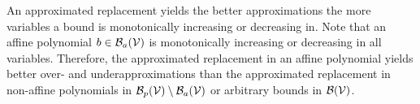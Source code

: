 An approximated replacement yields the better approximations the more variables a bound is monotonically increasing or decreasing in.
Note that an affine polynomial $b \in \mathcal{B}_a(\mathcal{V})$ is monotonically increasing or decreasing in all variables.
Therefore, the approximated replacement in an affine polynomial yields better over- and underapproximations than the approximated replacement in non-affine polynomials in $\mathcal{B}_p(\mathcal{V}) \setminus \mathcal{B}_a(\mathcal{V})$ or arbitrary bounds in $\mathcal{B}(\mathcal{V})$.
